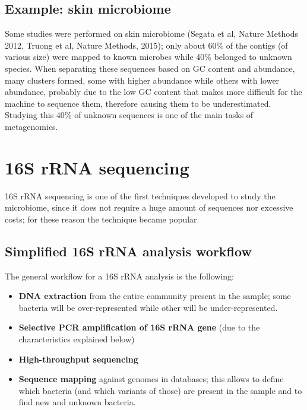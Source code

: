   \subsection{Example: skin microbiome}
    Some studies were performed on skin microbiome (Segata et al, Nature Methods 2012, Truong et al, Nature Methods, 2015); only about 60\% of the contigs (of various size) were mapped to known microbes while 40\% belonged to unknown species. When separating these sequences based on GC content and abundance, many clusters formed, some with higher abundance while others with lower abundance, probably due to the low GC content that makes more difficult for the machine to sequence them, therefore causing them to be underestimated. Studying this 40\% of unknown sequences is one of the main tasks of metagenomics.

\section{16S rRNA sequencing}

  16S rRNA sequencing is one of the first techniques developed to study the microbiome, since it does not require a huge amount of sequences nor excessive costs; for these reason the technique became popular.

  \subsection{Simplified 16S rRNA analysis workflow}
    The general workflow for a 16S rRNA analysis is the following:
    \begin{itemize}
      \item \textbf{DNA extraction} from the entire community present in the sample; some bacteria will be over-represented while other will be under-represented.
      \item \textbf{Selective PCR amplification of 16S rRNA gene} (due to the characteristics explained below)
      \item \textbf{High-throughput sequencing}
      \item \textbf{Sequence mapping} against genomes in databases; this allows to define which bacteria (and which variants of those) are present in the sample and to find new and unknown bacteria.
    \end{itemize}

